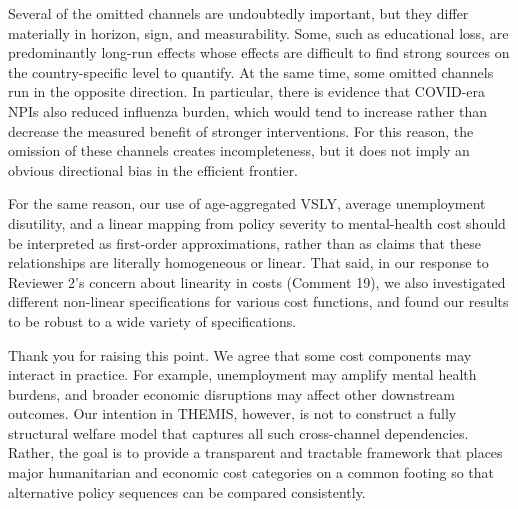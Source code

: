 \documentclass[letterpaper,twoside,11pt]{reviewresponse}
\begin{document}
Several of the omitted channels are undoubtedly important, but they differ materially in horizon, sign, and measurability. Some, such as educational loss, are predominantly long-run effects whose effects are difficult to find strong sources on the country-specific level to quantify. At the same time, some omitted channels run in the opposite direction. In particular, there is evidence that COVID-era NPIs also reduced influenza burden, which would tend to increase rather than decrease the measured benefit of stronger interventions. For this reason, the omission of these channels creates incompleteness, but it does not imply an obvious directional bias in the efficient frontier.

For the same reason, our use of age-aggregated VSLY, average unemployment disutility, and a linear mapping from policy severity to mental-health cost should be interpreted as first-order approximations, rather than as claims that these relationships are literally homogeneous or linear. That said, in our response to Reviewer 2's concern about linearity in costs (Comment 19), we also investigated different non-linear specifications for various cost functions, and found our results to be robust to a wide variety of specifications.

Thank you for raising this point. We agree that some cost components may interact in practice. For example, unemployment may amplify mental health burdens, and broader economic disruptions may affect other downstream outcomes. Our intention in THEMIS, however, is not to construct a fully structural welfare model that captures all such cross-channel dependencies. Rather, the goal is to provide a transparent and tractable framework that places major humanitarian and economic cost categories on a common footing so that alternative policy sequences can be compared consistently.
\end{document}
